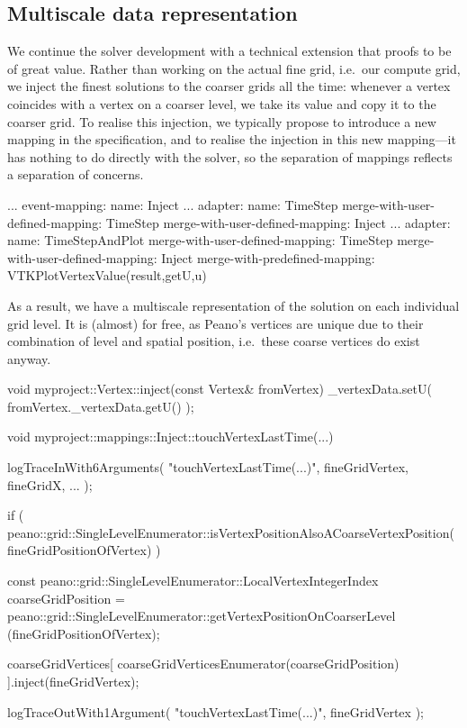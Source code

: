 \subsection{Multiscale data representation}

We continue the solver development with a technical extension that proofs to be
of great value.
Rather than working on the actual fine grid, i.e.~our compute grid, we inject
the finest solutions to the coarser grids all the time:
whenever a vertex coincides with a vertex on a coarser level, we take its value
and copy it to the coarser grid.
To realise this injection, we typically propose to introduce a new mapping in
the specification, and to realise the injection in this new mapping---it has
nothing to do directly with the solver, so the separation of mappings reflects a
separation of concerns.

\begin{code}
...
event-mapping:
  name: Inject
...
adapter:
  name: TimeStep
  merge-with-user-defined-mapping: TimeStep
  merge-with-user-defined-mapping: Inject
...
adapter:
  name: TimeStepAndPlot
  merge-with-user-defined-mapping: TimeStep
  merge-with-user-defined-mapping: Inject
  merge-with-predefined-mapping: VTKPlotVertexValue(result,getU,u)
\end{code}


\noindent
As a result, we have a multiscale representation of the solution on each
individual grid level.
It is (almost) for free, as Peano's vertices are unique due to their combination
of level and spatial position, i.e.~these coarse vertices do exist anyway.

\begin{code}
void myproject::Vertex::inject(const Vertex& fromVertex) {
  _vertexData.setU( fromVertex._vertexData.getU() );
}

void myproject::mappings::Inject::touchVertexLastTime(...) {
 logTraceInWith6Arguments( "touchVertexLastTime(...)", fineGridVertex, fineGridX, ... );

 if ( peano::grid::SingleLevelEnumerator::isVertexPositionAlsoACoarseVertexPosition(
  fineGridPositionOfVertex) ) {
  const peano::grid::SingleLevelEnumerator::LocalVertexIntegerIndex coarseGridPosition = 
   peano::grid::SingleLevelEnumerator::getVertexPositionOnCoarserLevel
   (fineGridPositionOfVertex);

  coarseGridVertices[ coarseGridVerticesEnumerator(coarseGridPosition) ].inject(fineGridVertex);
 }

 logTraceOutWith1Argument( "touchVertexLastTime(...)", fineGridVertex );
}
\end{code}

